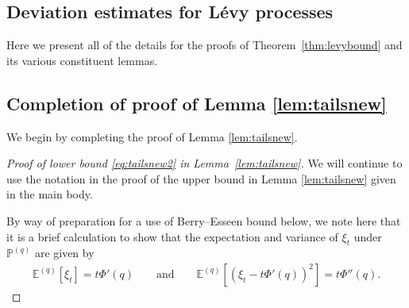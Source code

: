 \documentclass[a4,12pt]{amsart}
\numberwithin{equation}{section}
\begin{document}
\begin{appendix}
\section{Deviation estimates for L\'evy processes}

	Here we present all of the details for the proofs of Theorem~\ref{thm:levybound} and its various constituent lemmas.

\subsection{Completion of proof of Lemma \ref{lem:tailsnew}}
We begin by completing the proof of Lemma \ref{lem:tailsnew}.

	\begin{proof}[Proof of lower bound \eqref{eq:tailsnew2} in Lemma~\ref{lem:tailsnew}]
We will continue to use the notation in the proof of the upper bound in Lemma \ref{lem:tailsnew} given in the main body.\label{sec:tailsnewproof}


        
        By way of preparation for a use of Berry--Esseen bound below, we note here that \color{black} it is a brief calculation to show that the expectation and variance of $\xi_t$ under $\mathbb{P}^{(q)}$ are given by 
	\begin{align} \label{eq:center}
		\mathbb{E}^{(q)}[\xi_t] = t \Phi'(q) \qquad \text{and} \qquad \mathbb{E}^{(q)}\left[ (\xi_t - t \Phi'(q))^2 \right] = t \Phi''(q).
	\end{align}


\end{proof}
\end{appendix}
\end{document}
